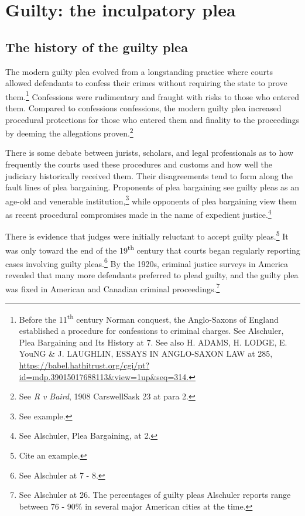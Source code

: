 \section{Guilty: the inculpatory plea}

\subsection{The history of the guilty plea}

The modern guilty plea evolved from a longstanding practice where courts allowed defendants to confess their crimes without requiring the state to prove them.\footnote{Before the 11\textsuperscript{th} century Norman conquest, the Anglo-Saxons of England established a procedure for confessions to criminal charges. See Alschuler, Plea Bargaining and Its History at 7. See also H. ADAMS, H. LODGE, E. YouNG \& J. LAUGHLIN, ESSAYS IN ANGLO-SAXON LAW at 285, \url{https://babel.hathitrust.org/cgi/pt?id=mdp.39015017688113\&view=1up\&seq=314.}} Confessions were rudimentary and fraught with risks to those who entered them. Compared to confessions confessions, the modern guilty plea increased procedural protections for those who entered them and finality to the proceedings by deeming the allegations proven.\footnote{See \textit{R v Baird}, 1908 CarswellSask 23 at para 2.}

There is some debate between jurists, scholars, and legal professionals as to how frequently the courts used these procedures and customs and how well the judiciary historically received them. Their disagreements tend to form along the fault lines of plea bargaining. Proponents of plea bargaining see guilty pleas as an age-old and venerable institution,\footnote{See example.} while opponents of plea bargaining view them as recent procedural compromises made in the name of expedient justice.\footnote{See Alschuler, Plea Bargaining, at 2.} 

There is evidence that judges were initially reluctant to accept guilty pleas.\footnote{Cite an example.} It was only toward the end of the 19\textsuperscript{th} century that courts began regularly reporting cases involving guilty pleas.\footnote{See Alschuler at 7 - 8.} By the 1920s, criminal justice surveys in America revealed that many more defendants preferred to plead guilty, and the guilty plea was fixed in American and Canadian criminal proceedings.\footnote{See Alschuler at 26. The percentages of guilty pleas Alschuler reports range between 76 - 90\% in several major American cities at the time.}

